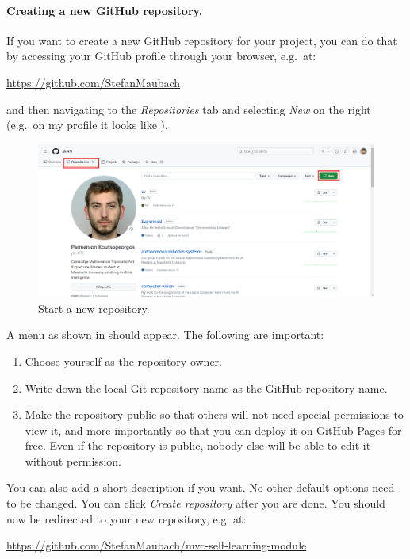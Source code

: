 \documentclass[a4paper,10pt]{article}
\begin{document}
\paragraph{Creating a new GitHub repository.} If you want to create a new GitHub repository for your project, you can do that by accessing your GitHub profile through your browser, e.g.\ at:

\url{https://github.com/StefanMaubach}

and then navigating to the \emph{Repositories} tab and selecting \emph{New} on the right (e.g.\ on my profile it looks like ).

\begin{figure}[htbp]
    \centering
    \includegraphics[width=\textwidth]{new_repository.png}
    \caption{Start a new repository.}
    \label{new_repository}   
\end{figure}

A menu as shown in  should appear. The following are important:
\begin{enumerate}
    \item Choose yourself as the repository owner.
    \item Write down the local Git repository name as the GitHub repository name.
    \item Make the repository public so that others will not need special permissions to view it, and more importantly so that you can deploy it on GitHub Pages for free. Even if the repository is public, nobody else will be able to edit it without permission.
\end{enumerate}
You can also add a short description if you want. No other default options need to be changed. You can click \emph{Create repository} after you are done. You should now be redirected to your new repository, e.g. at:

\url{https://github.com/StefanMaubach/mvc-self-learning-module}
\end{document}
